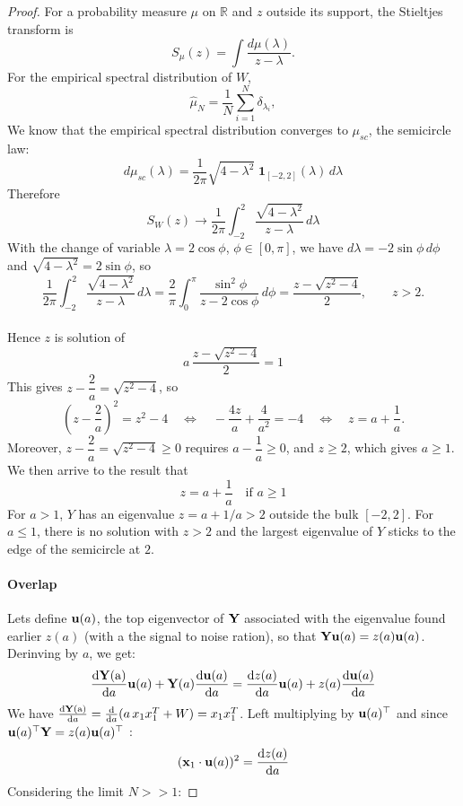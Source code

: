 \begin{proof}
    For a probability measure $\mu$ on $\mathbb{R}$ and $z$ outside its support, the Stieltjes transform is
    \[
    S_\mu(z) = \int \frac{d\mu(\lambda)}{z - \lambda} .
    \]
    For the empirical spectral distribution of $W$,
    \[
    \hat{\mu}_N = \frac{1}{N} \sum_{i=1}^{N} \delta_{\lambda_i},
    \]
    We know that the empirical spectral distribution converges to $\mu_{sc}$, the semicircle law:
    \[
    d\mu_{sc}(\lambda) = \frac{1}{2\pi} \sqrt{4 - \lambda^2}\; \mathbf{1}_{[-2,2]}(\lambda)\, d\lambda
    \]
    Therefore
    \[
    S_W(z) \to \frac{1}{2\pi} \int_{-2}^{2} \frac{\sqrt{4 - \lambda^2}}{z - \lambda}\, d\lambda
    \]
    With the change of variable $\lambda = 2 \cos \phi$, $\phi \in [0, \pi]$, we have $d\lambda = -2 \sin\phi\, d\phi$ and $\sqrt{4 - \lambda^2} = 2 \sin \phi$, so
    \[
    \frac{1}{2\pi} \int_{-2}^{2} \frac{\sqrt{4 - \lambda^2}}{z - \lambda}\, d\lambda
    = \frac{2}{\pi} \int_{0}^{\pi} \frac{\sin^2 \phi}{z - 2 \cos \phi}\, d\phi
    = \frac{z - \sqrt{z^2 - 4}}{2}, \qquad z > 2 .
    \]
    \\
    Hence $z$ is solution of
    \[
    a\, \frac{z - \sqrt{z^2 - 4}}{2} = 1
    \]
    This gives $z - \dfrac{2}{a} = \sqrt{z^2 - 4}$, so
    \[
    \left( z - \frac{2}{a} \right)^2 = z^2 - 4
    \quad \Longleftrightarrow \quad
    - \frac{4 z}{a} + \frac{4}{a^2} = -4
    \quad \Longleftrightarrow \quad
    z = a + \frac{1}{a} .
    \]
    Moreover, $z - \dfrac{2}{a} = \sqrt{z^2-4} \geq 0$ requires $a - \dfrac{1}{a} \geq 0$, and $z \geq 2$, which gives $a \geq 1$.\\
    We then arrive to the result that
    \[
    \boxed{
    z = a + \frac{1}{a} \quad \text{if } a \geq 1
    }
    \]
    For $a > 1$, $Y$ has an eigenvalue $z = a + 1/a > 2$ outside the bulk $[-2,2]$. For $a \leq 1$, there is no solution with $z > 2$ and the largest eigenvalue of $Y$ sticks to the edge of the semicircle at $2$.
    \paragraph{Overlap}
    Lets define $\boldsymbol{\mathbf{u}}(a)$, the top eigenvector of $\boldsymbol{\mathbf{Y}}$ associated with the eigenvalue found earlier $z(a)$ (with a the signal to noise ration), so that $\boldsymbol{\mathbf{Y}} \boldsymbol{\mathbf{u}}(a) = z(a) \boldsymbol{\mathbf{u}}(a) $. Derinving by $a$, we get:
    \[
    \frac{\mathrm{d \boldsymbol{\mathbf{Y}}(a)}}{\mathrm{d} a} \boldsymbol{\mathbf{u}}(a) + \boldsymbol{\mathbf{Y}}(a) \frac{\mathrm{d} \boldsymbol{\mathbf{u}}(a)}{\mathrm{d} a} = \frac{\mathrm{d} z(a)}{\mathrm{d} a} \boldsymbol{\mathbf{u}}(a) + z(a) \frac{\mathrm{d} \boldsymbol{\mathbf{u}}(a)}{\mathrm{d} a}
    \]
    We have $\frac{\mathrm{d \boldsymbol{\mathbf{Y}}(a)}}{\mathrm{d} a} = \frac{\mathrm{d}}{\mathrm{d} a} (a\, x_1 x_1^T + W) = x_1 x_1^T$. Left multiplying by $\boldsymbol{\mathbf{u}}(a) ^\top$ and since $\boldsymbol{\mathbf{u}}(a)^\top \boldsymbol{\mathbf{Y}} = z(a) \boldsymbol{\mathbf{u}}(a)^\top$ :
    \[
    (\boldsymbol{\mathbf{x}}_1 \cdot \boldsymbol{\mathbf{u}}(a))^2 = \frac{\mathrm{d} z(a)}{\mathrm{d} a}
    \]
    Considering the limit $N>>1$:
    

\end{proof}
